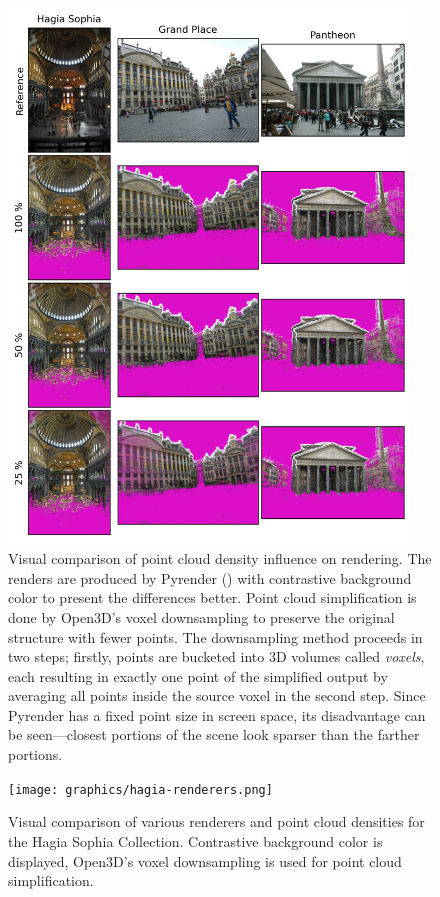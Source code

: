 \begin{figure}
    \centering
    \includegraphics[width=0.95\textwidth]{graphics/pcd-all}
    \caption[Visual comparison of point cloud density influence on rendering]{
    Visual comparison of point cloud density influence on rendering.
    The renders are produced by Pyrender (\protect{}) with contrastive
    background color to present the differences better. Point cloud
    simplification is done by Open3D's voxel downsampling to preserve the original
    structure with fewer points. The downsampling method proceeds in two steps;
    firstly, points are bucketed into 3D volumes called \emph{voxels},
    each resulting in exactly one point of the simplified output by averaging
    all points inside the source voxel in the second step. Since Pyrender
    has a fixed point size in screen space, its disadvantage can be seen---closest
    portions of the scene look sparser than the farther portions.}
    \label{fig:pcd_all}
\end{figure}

\begin{figure}
    \centering
    \texttt{[image: graphics/hagia-renderers.png]}
    \caption[Visual comparison of various renderers and point cloud
    densities for Hagia Sophia Collection]{Visual comparison of various
    renderers and point cloud densities for the Hagia Sophia Collection.
    Contrastive background color is displayed, Open3D's voxel downsampling is used
    for point cloud simplification.}
    \label{fig:hagia_renderers}
\end{figure}

